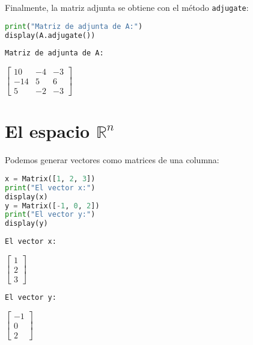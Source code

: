 \documentclass[a4,11pt]{aleph-notas}
\begin{document}
Finalmente, la matriz adjunta se obtiene con el método \texttt{adjugate}:
\begin{pycodigo}
    \begin{ipynbcodigo}\begin{lstlisting}[language=Python]
print("Matriz de adjunta de A:")
display(A.adjugate())
    \end{lstlisting}\end{ipynbcodigo}
    \begin{ipynbsalida}
    \begin{Verbatim}[commandchars=\\\{\}]
Matriz de adjunta de A:
    \end{Verbatim}

    $\displaystyle \left[\begin{matrix}10 & -4 & -3\\-14 & 5 & 6\\5 & -2 & -3\end{matrix}\right]$
    \end{ipynbsalida}
\end{pycodigo}

\section{El espacio $\mathbb{R}^n$}

Podemos generar vectores como matrices de una columna:
\begin{pycodigo}
    \begin{ipynbcodigo}\begin{lstlisting}[language=Python]
x = Matrix([1, 2, 3])
print("El vector x:")
display(x)
y = Matrix([-1, 0, 2])
print("El vector y:")
display(y)
    \end{lstlisting}\end{ipynbcodigo}
    \begin{ipynbsalida}
    \begin{Verbatim}[commandchars=\\\{\}]
El vector x:
    \end{Verbatim}

    $\displaystyle \left[\begin{matrix}1\\2\\3\end{matrix}\right]$

    
    \begin{Verbatim}[commandchars=\\\{\}]
El vector y:
    \end{Verbatim}

    $\displaystyle \left[\begin{matrix}-1\\0\\2\end{matrix}\right]$
    \end{ipynbsalida}
\end{pycodigo}
\end{document}
